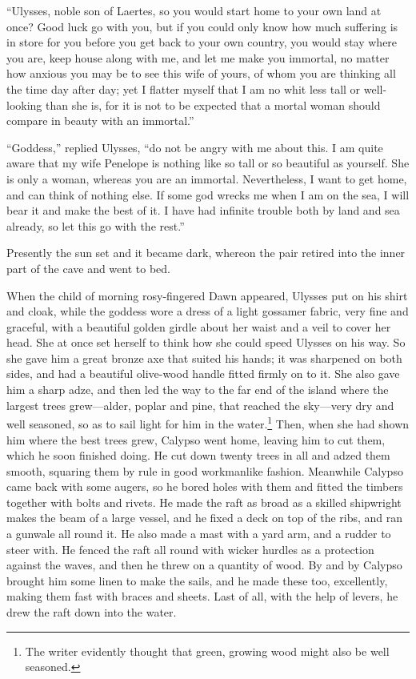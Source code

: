 “Ulysses, noble son of Laertes, so you would start home to your own land at
once? Good luck go with you, but if you could only know how much suffering is
in store for you before you get back to your own country, you would stay where
you are, keep house along with me, and let me make you immortal, no matter how
anxious you may be to see this wife of yours, of whom you are thinking all the
time day after day; yet I flatter myself that I am no whit less tall or
well-looking than she is, for it is not to be expected that a mortal woman
should compare in beauty with an immortal.”

“Goddess,” replied Ulysses, “do not be angry with me about this. I am quite
aware that my wife Penelope is nothing like so tall or so beautiful as
yourself. She is only a woman, whereas you are an immortal. Nevertheless, I
want to get home, and can think of nothing else. If some god wrecks me when I
am on the sea, I will bear it and make the best of it. I have had infinite
trouble both by land and sea already, so let this go with the rest.”

Presently the sun set and it became dark, whereon the pair retired into the
inner part of the cave and went to bed.

When the child of morning rosy-fingered Dawn appeared, Ulysses put on his shirt
and cloak, while the goddess wore a dress of a light gossamer fabric, very fine
and graceful, with a beautiful golden girdle about her waist and a veil to
cover her head. She at once set herself to think how she could speed Ulysses on
his way. So she gave him a great bronze axe that suited his hands; it was
sharpened on both sides, and had a beautiful olive-wood handle fitted firmly on
to it. She also gave him a sharp adze, and then led the way to the far end of
the island where the largest trees grew—alder, poplar and pine, that reached
the sky—very dry and well seasoned, so as to sail light for him in the water.\footnote{The writer evidently thought that green, growing wood might also be well
seasoned.} Then, when she
had shown him where the best trees grew, Calypso went home, leaving him to cut
them, which he soon finished doing. He cut down twenty trees in all and adzed
them smooth, squaring them by rule in good workmanlike fashion. Meanwhile
Calypso came back with some augers, so he bored holes with them and fitted the
timbers together with bolts and rivets. He made the raft as broad as a skilled
shipwright makes the beam of a large vessel, and he fixed a deck on top of the
ribs, and ran a gunwale all round it. He also made a mast with a yard arm, and
a rudder to steer with. He fenced the raft all round with wicker hurdles as a
protection against the waves, and then he threw on a quantity of wood. By and
by Calypso brought him some linen to make the sails, and he made these too,
excellently, making them fast with braces and sheets. Last of all, with the
help of levers, he drew the raft down into the water.

